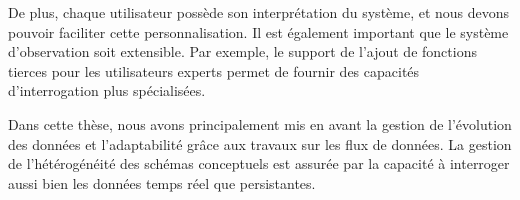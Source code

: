De plus, chaque utilisateur possède son interprétation du système, et nous devons pouvoir faciliter cette personnalisation. Il est également important que le système d'observation soit extensible. Par exemple, le support de l'ajout de fonctions tierces pour les utilisateurs experts permet de fournir des capacités d'interrogation plus spécialisées.

Dans cette thèse, nous avons principalement mis en avant la gestion de l'évolution des données et l'adaptabilité grâce aux travaux sur les flux de données. La gestion de l'hétérogénéité des schémas conceptuels est assurée par la capacité à interroger aussi bien les données temps réel que persistantes.
